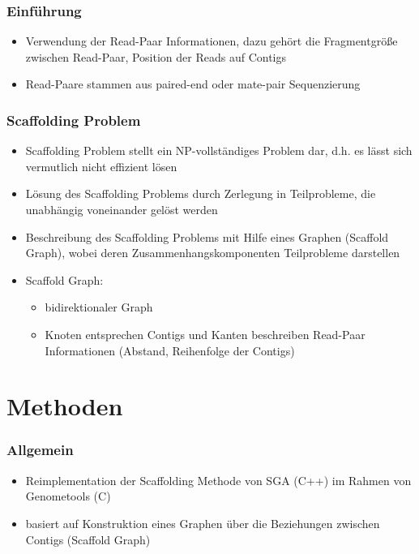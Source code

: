 \documentclass[xcolor=pst]{beamer}
\begin{document}
\begin{frame}
  \frametitle{Einführung}
  \begin{itemize}
  \item Verwendung der Read-Paar Informationen, dazu gehört die
    Fragmentgröße zwischen Read-Paar, Position der Reads auf Contigs
  \item Read-Paare stammen aus paired-end oder mate-pair Sequenzierung
  \end{itemize}
\end{frame}

\begin{frame}
  \frametitle{Scaffolding Problem}
  \begin{itemize}
  \item Scaffolding Problem stellt ein NP-vollständiges Problem
    dar, d.h. es lässt sich vermutlich nicht effizient lösen
  \item Lösung des Scaffolding Problems durch Zerlegung in
    Teilprobleme, die unabhängig voneinander gelöst werden
  \item Beschreibung des Scaffolding Problems mit Hilfe eines
    Graphen (Scaffold Graph), wobei deren Zusammenhangskomponenten
    Teilprobleme darstellen
  \item Scaffold Graph:
    \begin{itemize}
    \item bidirektionaler Graph
    \item Knoten entsprechen Contigs und Kanten beschreiben Read-Paar
      Informationen (Abstand, Reihenfolge der Contigs)
    \end{itemize}
  \end{itemize}
\end{frame}

\section{Methoden}
\begin{frame}
  \frametitle{Allgemein}
  \begin{itemize}
  \item Reimplementation der Scaffolding Methode von SGA (C++) im
    Rahmen von Genometools (C)
  \item basiert auf Konstruktion eines Graphen über die Beziehungen
    zwischen Contigs (Scaffold Graph)
  \end{itemize}
\end{frame}
\end{document}
